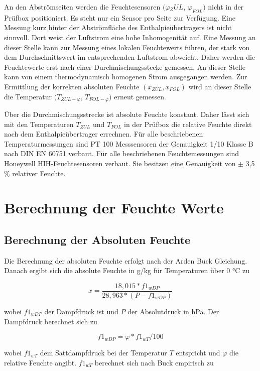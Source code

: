 An den Abströmseiten werden die Feuchtesensoren $(\varphi{_ZUL}$, $\varphi_{FOL})$ nicht in der Prüfbox positioniert. Es steht nur ein Sensor pro Seite zur Verfügung. Eine Messung kurz hinter der Abströmfläche des Enthalpieübertragers ist nicht sinnvoll. Dort weist der Luftstrom eine hohe Inhomogenität auf. Eine Messung an dieser Stelle kann zur Messung eines lokalen Feuchtewerts führen, der stark von dem Durchschnittswert im entsprechenden Luftstrom abweicht. Daher werden die Feuchtewerte erst nach einer Durchmischungsstecke gemessen. An dieser Stelle kann von einem thermodynamisch homogenen Strom ausgegangen werden. Zur Ermittlung der korrekten absoluten Feuchte $(x_{ZUL}, x_{FOL})$ wird an dieser Stelle die Temperatur $(T_{ZUL-\varphi}$, $T_{FOL-\varphi})$ erneut gemessen. 

Über die Durchmischungsstrecke ist absolute Feuchte konstant. Daher lässt sich mit den Temperaturen $T_{ZUL}$ und $T_{FOL}$ in der Prüfbox die relative Feuchte direkt nach dem Enthalpieübertrager errechnen.
Für alle beschriebenen Temperaturmessungen sind PT 100 Messsensoren der Genauigkeit 1/10 Klasse B nach DIN EN 60751 verbaut. Für alle beschriebenen Feuchtemessungen sind Honeywell HIH-Feuchtesensoren verbaut. Sie besitzen eine Genauigkeit von $\pm$ 3,5 \% relativer Feuchte. 

\section{Berechnung der Feuchte Werte}
\subsection{Berechnung der Absoluten Feuchte}
Die Berechnung der absoluten Feuchte erfolgt nach der Arden Buck Gleichung\cite{Buck.1981}. Danach ergibt sich die absolute Feuchte in g/kg für Temperaturen über 0 °C zu 

\begin{equation}
 x=\frac{18,015*f1_{wDP}}{28,963*(P-f1_{wDP})}
\end{equation} 

wobei $f1_{wDP}$ der Dampfdruck ist und $P$ der Absolutdruck in hPa.
Der Dampfdruck berechnet sich zu



\begin{equation}
f1_{wDP}=\varphi*f1_{wT}/100
\end{equation}

wobei $f1_{wT}$ dem Sattdampfdruck bei der Temperatur $T$ entspricht und $\varphi$ die relative Feuchte angibt. $f1_{wT}$ berechnet sich nach Buck empirisch zu

